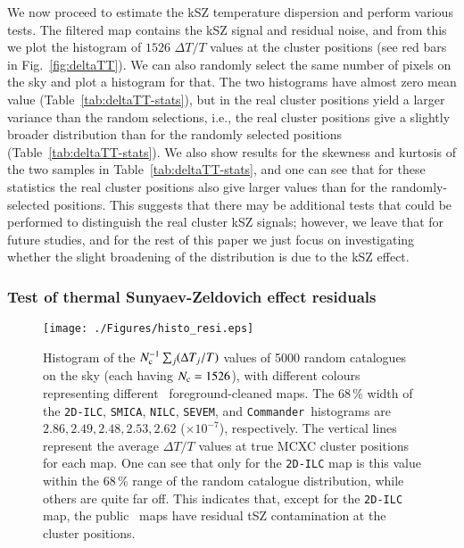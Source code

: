 \documentclass[traditabstract, longauth]{aa}
\newcommand{\commander}{{\tt Commander}}
\newcommand{\1}{\'\i }
\begin{document}
We now proceed to estimate the kSZ temperature dispersion
and perform various tests. The filtered map contains the kSZ signal and residual
noise, and from this we plot the histogram of $1526$ $\Delta T/T$ values at the
cluster positions (see red bars in Fig.~\ref{fig:deltaTT}). We can also
randomly select the same number of pixels on the sky and plot a histogram for
that. The two histograms have almost zero mean value
(Table~\ref{tab:deltaTT-stats}), but in the real cluster positions yield a
larger variance than the random selections, i.e., the real cluster positions
give a slightly broader distribution than for the randomly
selected positions (Table~\ref{tab:deltaTT-stats}). We also show results for
the skewness and kurtosis of the two samples in Table~\ref{tab:deltaTT-stats},
and one can see that for these statistics the real cluster positions also give
larger values than for the randomly-selected positions. This suggests that
there may be additional tests that could be performed to distinguish the
real cluster kSZ signals; however, we leave that for future studies, and for
the rest of this paper we just focus on investigating whether the slight
broadening of the distribution is due to the kSZ effect.

\subsubsection{Test of thermal Sunyaev-Zeldovich effect residuals}
\label{sec:tSZ-residual}

\begin{figure*}
\centering
\texttt{[image: ./Figures/histo\_resi.eps]}
\caption[fig:tSZ_resi]{Histogram of the $N_{\rm c}^{-1}\sum_{j}(\Delta
T_{j}/T)$ values of 5000 random catalogues on the sky (each having
$N_{\rm c}=1526$), with different colours representing different \Planck\
foreground-cleaned maps. The 68\,\%
width of the {\tt 2D-ILC}, {\tt SMICA}, {\tt NILC}, {\tt SEVEM},
and \commander\ histograms are
$2.86, 2.49, 2.48, 2.53, 2.62$ ($\times10^{-7}$), respectively. The vertical
lines represent the average $\Delta T/T$ values at true MCXC cluster positions
for each map. One can see that only for the {\tt 2D-ILC} map is this value
within the 68\,\% range of the random catalogue
distribution, while others are quite far off. This indicates that, except for
the {\tt 2D-ILC} map, the public \Planck\ maps have residual tSZ contamination
at the cluster positions.
}
\label{fig:tSZ-resi}
\end{figure*}
\end{document}
